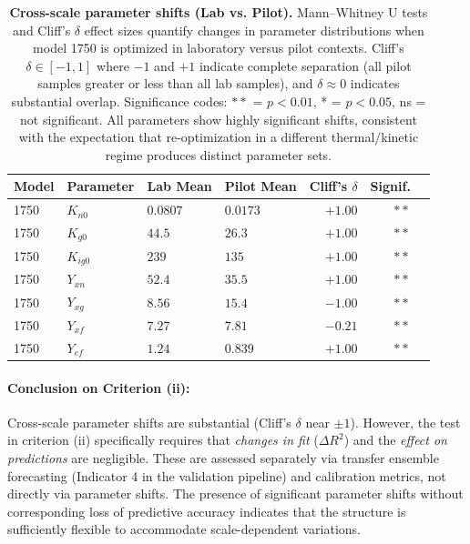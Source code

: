 \begin{table}[H]\centering
\caption{\textbf{Cross-scale parameter shifts (Lab vs. Pilot).} 
Mann--Whitney U tests and Cliff's $\delta$ effect sizes quantify changes in parameter 
distributions when model 1750 is optimized in laboratory versus pilot contexts. 
Cliff's $\delta \in [-1, 1]$ where $-1$ and $+1$ indicate complete separation 
(all pilot samples greater or less than all lab samples), and $\delta \approx 0$ indicates 
substantial overlap. Significance codes: $**$ = $p < 0.01$, * = $p < 0.05$, ns = not significant. 
All parameters show highly significant shifts, consistent with the expectation that 
re-optimization in a different thermal/kinetic regime produces distinct parameter sets.}
\label{tab:SI_X_2_param_transfer}
\small
\begin{tabular}{llllrrl}
\toprule
\textbf{Model} & \textbf{Parameter} & \textbf{Lab Mean} & \textbf{Pilot Mean} & 
\textbf{Cliff's $\delta$} & \textbf{Signif.} \\
\midrule
1750 & $K_{n0}$ & $0.0807$ & $0.0173$ & $+1.00$ & $**$ \\
1750 & $K_{g0}$ & $44.5$ & $26.3$ & $+1.00$ & $**$ \\
1750 & $K_{ig0}$ & $239$ & $135$ & $+1.00$ & $**$ \\
1750 & $Y_{xn}$ & $52.4$ & $35.5$ & $+1.00$ & $**$ \\
1750 & $Y_{xg}$ & $8.56$ & $15.4$ & $-1.00$ & $**$ \\
1750 & $Y_{xf}$ & $7.27$ & $7.81$ & $-0.21$ & $**$ \\
1750 & $Y_{ef}$ & $1.24$ & $0.839$ & $+1.00$ & $**$ \\
\bottomrule
\end{tabular}
\end{table}

\paragraph{Conclusion on Criterion (ii):}
Cross-scale parameter shifts are substantial (Cliff's $\delta$ near $\pm 1$). However, the 
test in criterion (ii) specifically requires that \emph{changes in fit} ($\Delta R^2$) and 
the \emph{effect on predictions} are negligible. These are assessed separately via 
transfer ensemble forecasting (Indicator 4 in the validation pipeline) and calibration 
metrics, not directly via parameter shifts. The presence of significant parameter shifts 
without corresponding loss of predictive accuracy indicates that the structure is 
sufficiently flexible to accommodate scale-dependent variations.

